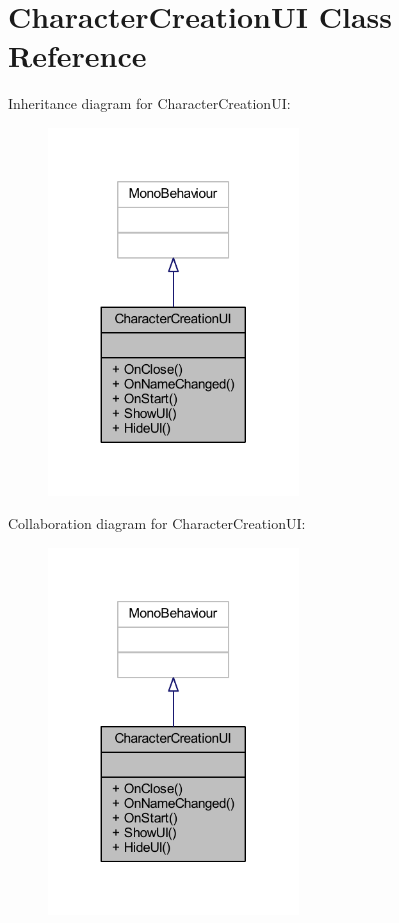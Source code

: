 \hypertarget{class_character_creation_u_i}{}\section{Character\+Creation\+UI Class Reference}
\label{class_character_creation_u_i}


Inheritance diagram for Character\+Creation\+UI\+:\nopagebreak
\begin{figure}[H]
\begin{center}
\leavevmode
\includegraphics[width=188pt]{class_character_creation_u_i__inherit__graph}
\end{center}
\end{figure}


Collaboration diagram for Character\+Creation\+UI\+:\nopagebreak
\begin{figure}[H]
\begin{center}
\leavevmode
\includegraphics[width=188pt]{class_character_creation_u_i__coll__graph}
\end{center}
\end{figure}
